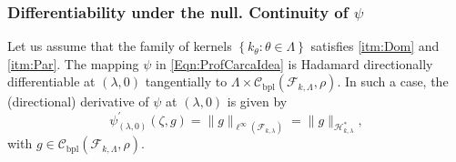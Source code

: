 		\subsubsection*{\color{orange} Differentiability under the null. Continuity of $\psi$}
			\begin{Th}\label{Th:Diff0}
				Let us assume that the family of kernels $\left\{k_{\theta}:\theta\in\Lambda\right\}$ satisfies \ref{itm:Dom} and \ref{itm:Par}. The mapping $\psi$ in \eqref{Eqn:ProfCarcaIdea} is Hadamard directionally differentiable at $(\lambda,0)$ tangentially to $\Lambda\times\mathcal{C}_{\operatorname{bpl}}\left(\mathcal{F}_{k,\Lambda},\rho\right)$. In such a case, the (directional) derivative of $\psi$ at $(\lambda,0)$ is given by
				\begin{equation}\label{Eqn:psi_prime0}
					\psi_{(\lambda,0)}^{\prime}(\zeta,g)=\|g\|_{\ell^{\infty}\left(\mathcal{F}_{k,\lambda}\right)}=\|g\|_{\mathcal{H}_{k,\lambda}^{\ast}},
				\end{equation}
				with $g\in\mathcal{C}_{\operatorname{bpl}}\left(\mathcal{F}_{k,\Lambda},\rho\right)$.
			\end{Th}
